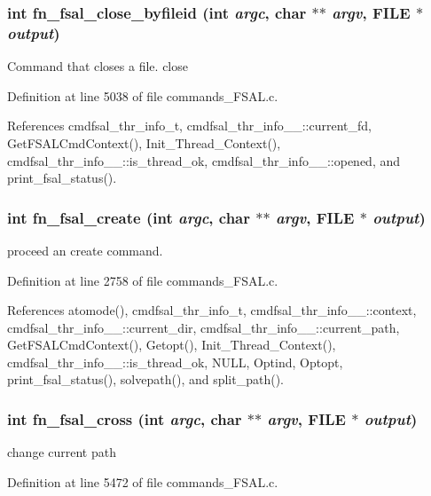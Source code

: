 \subsubsection{\setlength{\rightskip}{0pt plus 5cm}int fn\_\-fsal\_\-close\_\-byfileid (int {\em argc}, char $\ast$$\ast$ {\em argv}, FILE $\ast$ {\em output})}\label{commands__FSAL_8c_a42}


Command that closes a file. close 

Definition at line 5038 of file commands\_\-FSAL.c.

References cmdfsal\_\-thr\_\-info\_\-t, cmdfsal\_\-thr\_\-info\_\-\_\-::current\_\-fd, Get\-FSALCmd\-Context(), Init\_\-Thread\_\-Context(), cmdfsal\_\-thr\_\-info\_\-\_\-::is\_\-thread\_\-ok, cmdfsal\_\-thr\_\-info\_\-\_\-::opened, and print\_\-fsal\_\-status().
\subsubsection{\setlength{\rightskip}{0pt plus 5cm}int fn\_\-fsal\_\-create (int {\em argc}, char $\ast$$\ast$ {\em argv}, FILE $\ast$ {\em output})}\label{commands__FSAL_8c_a32}


proceed an create command. 

Definition at line 2758 of file commands\_\-FSAL.c.

References atomode(), cmdfsal\_\-thr\_\-info\_\-t, cmdfsal\_\-thr\_\-info\_\-\_\-::context, cmdfsal\_\-thr\_\-info\_\-\_\-::current\_\-dir, cmdfsal\_\-thr\_\-info\_\-\_\-::current\_\-path, Get\-FSALCmd\-Context(), Getopt(), Init\_\-Thread\_\-Context(), cmdfsal\_\-thr\_\-info\_\-\_\-::is\_\-thread\_\-ok, NULL, Optind, Optopt, print\_\-fsal\_\-status(), solvepath(), and split\_\-path().
\subsubsection{\setlength{\rightskip}{0pt plus 5cm}int fn\_\-fsal\_\-cross (int {\em argc}, char $\ast$$\ast$ {\em argv}, FILE $\ast$ {\em output})}\label{commands__FSAL_8c_a45}


change current path 

Definition at line 5472 of file commands\_\-FSAL.c.

